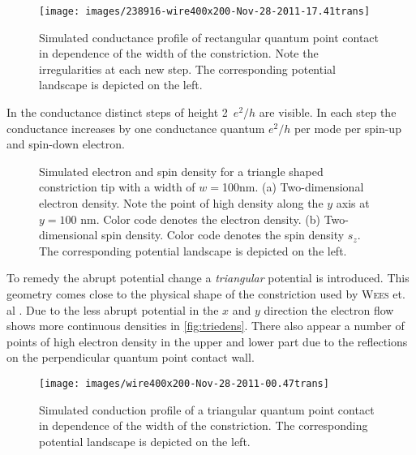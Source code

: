 \begin{figure}[h]
\centering
\texttt{[image: images/238916-wire400x200-Nov-28-2011-17.41trans]}
\caption{Simulated conductance profile of rectangular quantum point contact in dependence of the width of the constriction. Note the irregularities at each new step. The corresponding potential landscape is depicted on the left.}
\end{figure}
In the conductance distinct steps of height 2~$e^2/h$ are visible. In each step the conductance increases by one conductance quantum $e^2/h$ per mode per spin-up and spin-down electron.\par
\begin{figure}[h]
\caption{Simulated electron and spin density for a triangle shaped constriction tip with a width of $w=$100nm. (a) Two-dimensional electron density. Note the point of high density along the $y$ axis at $y=100$ nm. Color code denotes the electron density. (b) Two-dimensional spin density.  Color code denotes the spin density $s_z$. The corresponding potential landscape is depicted on the left.}
\end{figure}
To remedy the abrupt potential change a \emph{triangular} potential is introduced. This geometry comes close to the physical shape of the constriction used by \textsc{Wees} et. al \cite{PhysRevLett.60.848}. Due to the less abrupt potential in the $x$ and $y$ direction the electron flow shows more continuous densities in \cref{fig:triedens}. There also appear a number of points of high electron density in the upper and lower part due to the reflections on the perpendicular quantum point contact wall.\par
\begin{figure}[h]
\centering
\texttt{[image: images/wire400x200-Nov-28-2011-00.47trans]}
\caption{Simulated conduction profile of a triangular quantum point contact in dependence of the width of the constriction. The corresponding potential landscape is depicted on the left.}\label{fig:tritrans}
\end{figure}
